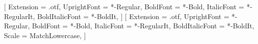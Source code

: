 \usepackage[french]{babel}
\usepackage{fontspec}

\usepackage{amsmath}
\usepackage{unicode-math}
\setmainfont{SourceSansPro}[
  Extension      = .otf,
  UprightFont    = *-Regular,
  BoldFont       = *-Bold,
  ItalicFont     = *-RegularIt,
  BoldItalicFont = *-BoldIt,
]
\setmonofont{SourceCodePro}[
  Extension      = .otf,
  UprightFont    = *-Regular,
  BoldFont       = *-Bold,
  ItalicFont     = *-RegularIt,
  BoldItalicFont = *-BoldIt,
  Scale          = MatchLowercase,
]

\usepackage[letterpaper, margin=2cm, top=2.5cm, bottom=2.5cm, headheight=14pt]{geometry}
\setlength{\parindent}{0pt}
\setlength{\parskip}{0.5em}
\setlength{\emergencystretch}{3em}  %

\usepackage{xcolor}
\usepackage{graphicx}
\graphicspath{{img/}}
\usepackage{array}
\usepackage{tabularx}
\usepackage{booktabs}          %
\usepackage{enumitem}
\usepackage{multicol}
\usepackage{needspace}
\usepackage{lastpage}          %
\usepackage{fancyhdr}
\usepackage[most]{tcolorbox}   %
\usepackage{listings}          %






